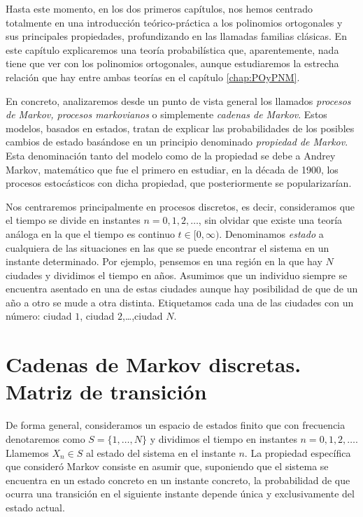 %
%


Hasta este momento, en los dos primeros capítulos, nos hemos centrado totalmente en una introducción teórico-práctica a los polinomios ortogonales y sus principales propiedades, profundizando en las llamadas familias clásicas. En este capítulo explicaremos una teoría probabilística que, aparentemente, nada tiene que ver con los polinomios ortogonales, aunque estudiaremos la estrecha relación que hay entre ambas teorías en el capítulo \ref{chap:POyPNM}.

En concreto, analizaremos desde un punto de vista general los llamados \textit{procesos de Markov, procesos markovianos} o simplemente \textit{cadenas de Markov}. Estos modelos, basados en estados, tratan de explicar las probabilidades de los posibles cambios de estado basándose en un principio denominado \textit{propiedad de Markov}. Esta denominación tanto del modelo como de la propiedad se debe a Andrey Markov, matemático que fue el primero en estudiar, en la década de 1900, los procesos estocásticos con dicha propiedad, que posteriormente se popularizarían.

Nos centraremos principalmente en procesos discretos, es decir, consideramos que el tiempo se divide en instantes $n=0,1,2,\dots$, sin olvidar que existe una teoría análoga en la que el tiempo es continuo $t\in[0,\infty)$. Denominamos \textit{estado} a cualquiera de las situaciones en las que se puede encontrar el sistema en un instante determinado. Por ejemplo, pensemos en una región en la que hay $N$ ciudades y dividimos el tiempo en años. Asumimos que un individuo siempre se encuentra asentado en una de estas ciudades aunque hay posibilidad de que de un año a otro se mude a otra distinta. Etiquetamos cada una de las ciudades con un número: ciudad $1$, ciudad $2$,\dots,ciudad $N$.

\section{Cadenas de Markov discretas. Matriz de transición}

De forma general, consideramos un espacio de estados finito que con frecuencia denotaremos como $S=\{1,\dots, N\}$ y dividimos el tiempo en instantes $n=0,1,2,\dots$. Llamemos $X_n\in S$ al estado del sistema en el instante $n$. La propiedad específica que consideró Markov consiste en asumir que, suponiendo que el sistema se encuentra en un estado concreto en un instante concreto, la probabilidad de que ocurra una transición en el siguiente instante depende única y exclusivamente del estado actual.

